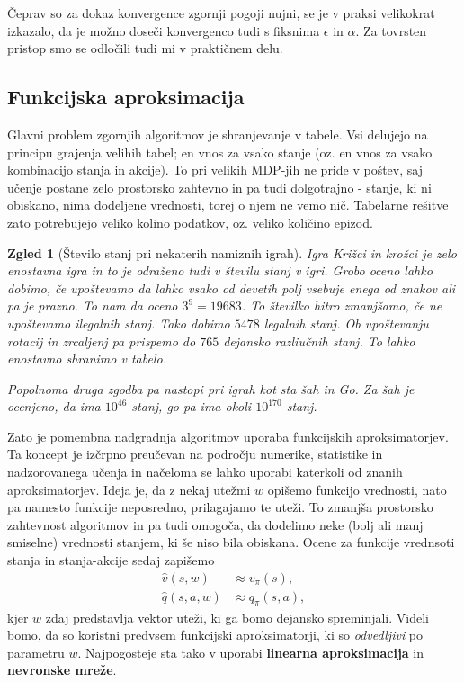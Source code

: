 \documentclass[12pt,a4paper]{amsart}
\theoremstyle{definition} %
\theoremstyle{plain} %
\newtheorem{zgled}[definicija]{Zgled}
\begin{document}
Čeprav so za dokaz konvergence zgornji pogoji nujni, se je v praksi velikokrat izkazalo, da je možno 
doseči konvergenco tudi s fiksnima $\epsilon$ in $\alpha$. Za tovrsten pristop smo se odločili tudi 
mi v praktičnem delu.

\subsection{Funkcijska aproksimacija}
Glavni problem zgornjih algoritmov je shranjevanje v tabele. Vsi delujejo na principu grajenja 
velihih tabel; en vnos za vsako stanje (oz. en vnos za vsako kombinacijo stanja in akcije). To pri 
velikih MDP-jih ne pride v poštev, saj učenje postane zelo prostorsko zahtevno in pa tudi 
dolgotrajno - stanje, ki ni obiskano, nima dodeljene vrednosti, torej o njem ne vemo nič. Tabelarne 
rešitve zato potrebujejo veliko kolino podatkov, oz. veliko količino epizod.  

\begin{zgled}[Število stanj pri nekaterih namiznih igrah]
    Igra Križci in krožci je zelo enostavna igra in to je odraženo tudi v številu stanj v igri. 
    Grobo oceno lahko dobimo, če upoštevamo da lahko vsako od devetih polj vsebuje enega od znakov 
    ali pa je prazno. To nam da oceno $3^9 = 19683$. To številko hitro zmanjšamo, če ne upoštevamo 
    ilegalnih stanj. Tako dobimo $5478$ legalnih stanj. Ob upoštevanju rotacij in zrcaljenj pa 
    prispemo do $765$ dejansko razliučnih stanj. To lahko enostavno shranimo v tabelo. 

    Popolnoma druga zgodba pa nastopi pri igrah kot sta šah in Go. Za šah je ocenjeno, da ima 
    $10^{46}$ stanj, go pa ima okoli $10^{170}$ stanj.
\end{zgled}

Zato je pomembna nadgradnja algoritmov uporaba funkcijskih aproksimatorjev. Ta koncept je izčrpno 
preučevan na področju numerike, statistike in nadzorovanega učenja in načeloma se lahko uporabi 
katerkoli od znanih aproksimatorjev. Ideja je, da z nekaj utežmi $w$ opišemo funkcijo vrednosti, nato
pa namesto funkcije neposredno, prilagajamo te uteži. To zmanjša prostorsko zahtevnost algoritmov 
in pa tudi omogoča, da dodelimo neke (bolj ali manj smiselne) vrednosti stanjem, ki še niso bila 
obiskana. Ocene za funkcije vrednsoti stanja in stanja-akcije sedaj zapišemo
\begin{align*}
    \hat{v}(s, w) &\approx v_\pi(s), \\
    \hat{q}(s, a, w) &\approx q_\pi(s, a), 
\end{align*}
kjer $w$ zdaj predstavlja vektor uteži, ki ga bomo dejansko spreminjali. Videli bomo, da so koristni
predvsem funkcijski aproksimatorji, ki so \textit{odvedljivi} po parametru $w$. Najpogosteje sta tako v 
uporabi \textbf{linearna aproksimacija} in \textbf{nevronske mreže}. 
\end{document}
